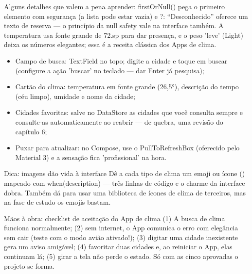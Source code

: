 Alguns detalhes que valem a pena aprender: firstOrNull() pega o primeiro elemento com segurança (a lista pode estar vazia) e ?: “Desconhecido” oferece um texto de reserva — o princípio da null safety vale na interface também. A temperatura usa fonte grande de 72.sp para dar presença, e o peso 'leve' (Light) deixa os números elegantes; essa é a receita clássica dos Apps de clima.



\begin{itemize}
  \item Campo de busca: TextField no topo; digite a cidade e toque em buscar (configure a ação 'buscar' no teclado — dar Enter já pesquisa);
  \item Cartão do clima: temperatura em fonte grande (26,5°), descrição do tempo (céu limpo), umidade e nome da cidade;
  \item Cidades favoritas: salve no DataStore as cidades que você consulta sempre e consulte-as automaticamente ao reabrir — de quebra, uma revisão do capítulo 6;
  \item Puxar para atualizar: no Compose, use o PullToRefreshBox (oferecido pelo Material 3) e a sensação fica 'profissional' na hora.
\end{itemize}

\begin{tcbinfo}{Dica: imagens dão vida à interface}
Dê a cada tipo de clima um emoji ou ícone () mapeado com when(description) — três linhas de código e o charme da interface dobra. Também dá para usar uma biblioteca de ícones de clima de terceiros, mas na fase de estudo os emojis bastam.

\end{tcbinfo}

\begin{tcbpractice}{Mãos à obra: checklist de aceitação do App de clima}
(1) A busca de clima funciona normalmente; (2) sem internet, o App comunica o erro com elegância sem cair (teste com o modo avião ativado!); (3) digitar uma cidade inexistente gera um aviso amigável; (4) favoritar duas cidades e, ao reiniciar o App, elas continuam lá; (5) girar a tela não perde o estado. Só com as cinco aprovadas o projeto se forma.

\end{tcbpractice}

